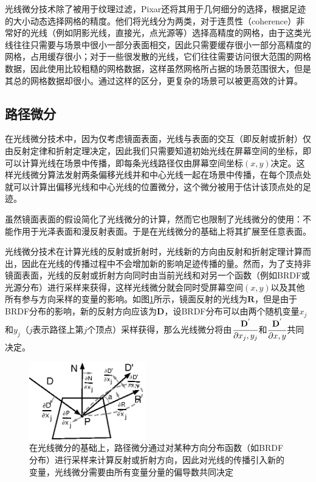光线微分技术除了被用于纹理过滤，Pixar\cite{a:RayDifferentialsandMultiresolutionGeometryCachingforDistributionRayTracinginComplexScenes,a:RayTracingfortheMovieCars}还将其用于几何细分的选择，根据足迹的大小动态选择网格的精度。他们将光线分为两类，对于连贯性（coherence）非常好的光线（例如阴影光线，直接光，点光源等）选择高精度的网格，由于这类光线往往只需要与场景中很小一部分表面相交，因此只需要缓存很小一部分高精度的网格，占用缓存很小；对于一些很发散的光线，它们往往需要访问很大范围的网格数据，因此使用比较粗糙的网格数据，这样虽然网格所占据的场景范围很大，但是其总的网格数据却很小。通过这样的区分，更复杂的场景可以被更高效的计算。








\subsection{路径微分}\label{sec:pt-path-differentials}
在光线微分技术中，因为仅考虑镜面表面，光线与表面的交互（即反射或折射）仅由反射定律和折射定理决定，因此我们只需要知道初始光线在屏幕空间的坐标，即可以计算光线在场景中传播，即每条光线路径仅由屏幕空间坐标$(x,y)$决定。这样光线微分算法发射两条偏移光线并和中心光线一起在场景中传播，在每个顶点处就可以计算出偏移光线和中心光线的位置微分，这个微分被用于估计该顶点处的足迹。

虽然镜面表面的假设简化了光线微分的计算，然而它也限制了光线微分的使用：不能作用于光泽表面和漫反射表面。于是\cite{a:Pathdifferentialsandapplications}在光线微分的基础上将其扩展至任意表面。

光线微分技术在计算光线的反射或折射时，光线新的方向由反射和折射定理计算而出，因此在光线的传播过程中不会增加新的影响足迹传播的量。然而，为了支持非镜面表面，光线的反射或折射方向同时由当前光线和对另一个函数（例如BRDF或光源分布）进行采样来获得，这样光线微分就会同时受屏幕空间$(x,y)$以及其他所有参与方向采样的变量的影响。如图\ref{f:pt-path-differentials}所示，镜面反射的光线为$\mathbf{R}$，但是由于BRDF分布的影响，新的反射方向应该为$\mathbf{D}$，设BRDF分布可以由两个随机变量$x_j$和$y_j$（$j$表示路径上第$j$个顶点）采样获得，那么光线微分将由$ \cfrac{\mathbf{D}^{'}}{{\rm \partial} x_j,y_j}$和$ \cfrac{\mathbf{D}^{'}}{{\rm \partial} x,y}$共同决定。

\begin{figure}
	\sidecaption
	\includegraphics[width=0.45\textwidth]{figures/pt/path-differentials}
	\caption{在光线微分的基础上，路径微分通过对某种方向分布函数（如BRDF分布）进行采样来计算反射或折射方向，因此对光线的传播引入新的变量，光线微分需要由所有变量分量的偏导数共同决定}
	\label{f:pt-path-differentials}
\end{figure}


